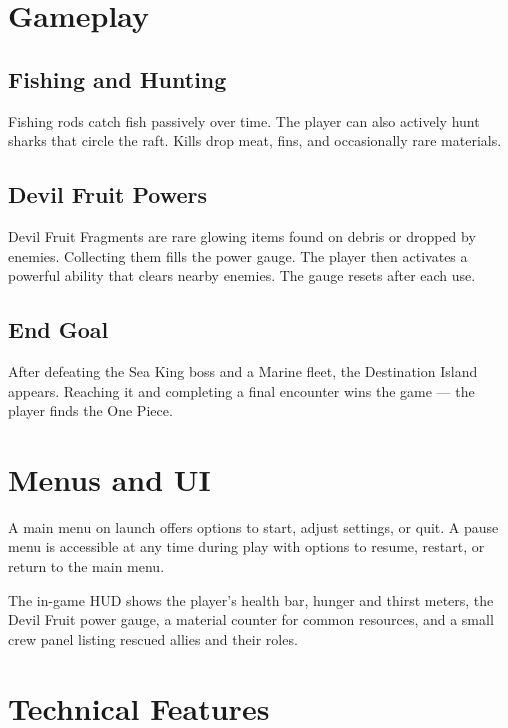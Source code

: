 \documentclass[12pt, a4paper]{article}
\begin{document}
\section{Gameplay}

\subsection{Fishing and Hunting}
Fishing rods catch fish passively over time. The player can also actively hunt sharks that circle the raft.
Kills drop meat, fins, and occasionally rare materials.

\subsection{Devil Fruit Powers}
Devil Fruit Fragments are rare glowing items found on debris or dropped by enemies. Collecting them fills
the power gauge. The player then activates a powerful ability that clears nearby enemies. The gauge resets
after each use.

\subsection{End Goal}
After defeating the Sea King boss and a Marine fleet, the Destination Island appears. Reaching it and
completing a final encounter wins the game --- the player finds the One Piece.

\section{Menus and UI}

A main menu on launch offers options to start, adjust settings, or quit. A pause menu is accessible at any time
during play with options to resume, restart, or return to the main menu.

The in-game HUD shows the player's health bar, hunger and thirst meters, the Devil Fruit power gauge, a
material counter for common resources, and a small crew panel listing rescued allies and their roles.

\section{Technical Features}
\end{document}
